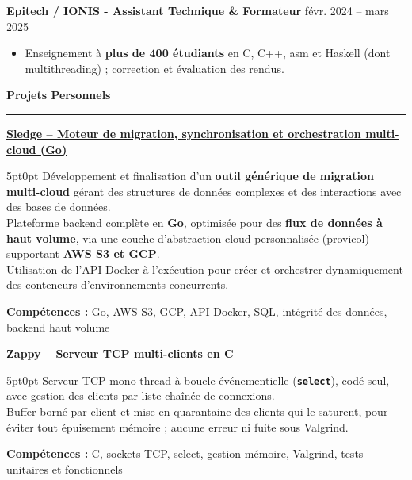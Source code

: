 \documentclass[9pt]{extarticle}
\begin{document}
\par\vspace{5pt}

{\bfseries Epitech / IONIS - Assistant Technique \& Formateur} \hfill févr. 2024 -- mars 2025
\begin{itemize}[noitemsep, topsep=0pt]
	\item Enseignement à {\bfseries plus de 400 étudiants} en C, C++, asm et Haskell (dont multithreading) ; correction et évaluation des rendus.
\end{itemize}

\par\vspace{5pt}

{\large\bfseries Projets Personnels}
\par\vspace{-8pt}
\rule{\linewidth}{0.4pt}
\par\vspace{5pt}

\underline{\bfseries Sledge -- Moteur de migration, synchronisation et orchestration multi-cloud (Go)}
\par
\begin{adjustwidth}{5pt}{0pt}
    Développement et finalisation d'un {\bfseries outil générique de migration multi-cloud} gérant des structures de données complexes et des interactions avec des bases de données. \\
    Plateforme backend complète en {\bfseries Go}, optimisée pour des {\bfseries flux de données à haut volume}, via une couche d'abstraction cloud personnalisée ({\ttfamily provicol}) supportant {\bfseries AWS S3 et GCP}. \\
    Utilisation de l'API Docker à l'exécution pour créer et orchestrer dynamiquement des conteneurs d'environnements concurrents.
\end{adjustwidth}
\par
{\bfseries Compétences :} Go, AWS S3, GCP, API Docker, SQL, intégrité des données, backend haut volume

\par\vspace{8pt}

\underline{\bfseries Zappy -- Serveur TCP multi-clients en C}
\par
\begin{adjustwidth}{5pt}{0pt}
    Serveur TCP mono-thread à boucle événementielle ({\bfseries \texttt{select}}), codé seul, avec gestion des clients par liste chaînée de connexions. \\
    Buffer borné par client et mise en quarantaine des clients qui le saturent, pour éviter tout épuisement mémoire ; aucune erreur ni fuite sous Valgrind.
\end{adjustwidth}
\par
{\bfseries Compétences :} C, sockets TCP, select, gestion mémoire, Valgrind, tests unitaires et fonctionnels
\end{document}
